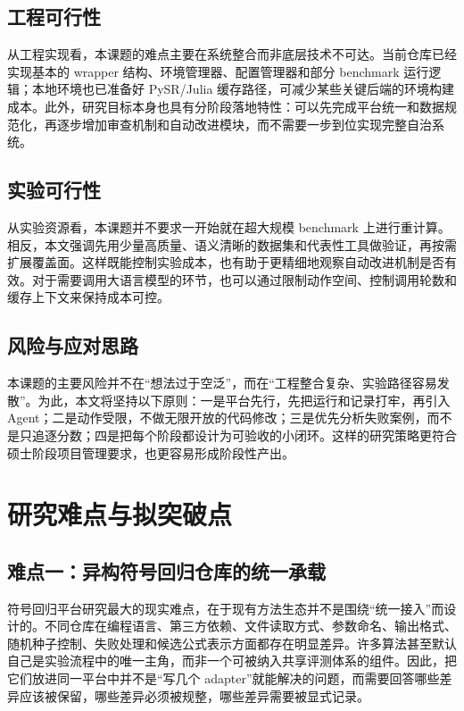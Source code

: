 \documentclass[UTF8,12pt]{ctexart}
\begin{document}
\subsection{工程可行性}

从工程实现看，本课题的难点主要在系统整合而非底层技术不可达。当前仓库已经实现基本的 wrapper 结构、环境管理器、配置管理器和部分 benchmark 运行逻辑；本地环境也已准备好 PySR/Julia 缓存路径，可减少某些关键后端的环境构建成本。此外，研究目标本身也具有分阶段落地特性：可以先完成平台统一和数据规范化，再逐步增加审查机制和自动改进模块，而不需要一步到位实现完整自治系统。

\subsection{实验可行性}

从实验资源看，本课题并不要求一开始就在超大规模 benchmark 上进行重计算。相反，本文强调先用少量高质量、语义清晰的数据集和代表性工具做验证，再按需扩展覆盖面。这样既能控制实验成本，也有助于更精细地观察自动改进机制是否有效。对于需要调用大语言模型的环节，也可以通过限制动作空间、控制调用轮数和缓存上下文来保持成本可控。

\subsection{风险与应对思路}

本课题的主要风险并不在“想法过于空泛”，而在“工程整合复杂、实验路径容易发散”。为此，本文将坚持以下原则：一是平台先行，先把运行和记录打牢，再引入 Agent；二是动作受限，不做无限开放的代码修改；三是优先分析失败案例，而不是只追逐分数；四是把每个阶段都设计为可验收的小闭环。这样的研究策略更符合硕士阶段项目管理要求，也更容易形成阶段性产出。

\section{研究难点与拟突破点}

\subsection{难点一：异构符号回归仓库的统一承载}

符号回归平台研究最大的现实难点，在于现有方法生态并不是围绕“统一接入”而设计的。不同仓库在编程语言、第三方依赖、文件读取方式、参数命名、输出格式、随机种子控制、失败处理和候选公式表示方面都存在明显差异。许多算法甚至默认自己是实验流程中的唯一主角，而非一个可被纳入共享评测体系的组件。因此，把它们放进同一平台中并不是“写几个 adapter”就能解决的问题，而需要回答哪些差异应该被保留，哪些差异必须被规整，哪些差异需要被显式记录。
\end{document}
